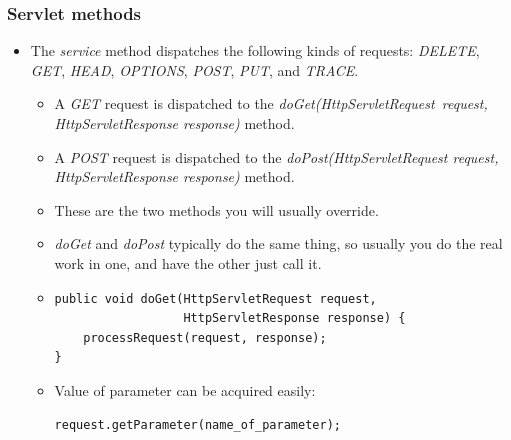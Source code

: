 \documentclass[10pt,xcolor=pdflatex]{beamer}
\begin{document}
\begin{frame}[containsverbatim]\frametitle{Servlet methods}
  \begin{itemize}
	\item The \emph{service} method dispatches the following kinds of requests: \emph{DELETE}, \emph{GET}, \emph{HEAD}, \emph{OPTIONS}, \emph{POST}, \emph{PUT}, and \emph{TRACE}.
	  \begin{itemize}
	    \item A \emph{GET} request is dispatched to the \emph{doGet(HttpServletRequest~request, HttpServletResponse response)} method.
	    \item A \emph{POST} request is dispatched to the \emph{doPost(HttpServletRequest request, HttpServletResponse response)} method.
	    \item These are the two methods you will usually override.
	    \item \emph{doGet} and \emph{doPost} typically do the same thing, so usually you do the real work in one, and have the other just call it.
	    \item[] \begin{verbatim} 
public void doGet(HttpServletRequest request, 
                  HttpServletResponse response) {
    processRequest(request, response);
}
\end{verbatim} 
        \item Value of parameter can be acquired easily: \begin{verbatim} 
request.getParameter(name_of_parameter);
\end{verbatim} 
    \end{itemize}
  \end{itemize}
\end{frame}
\end{document}
